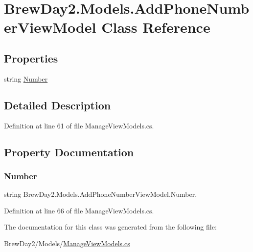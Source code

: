 \hypertarget{class_brew_day2_1_1_models_1_1_add_phone_number_view_model}{}\section{Brew\+Day2.\+Models.\+Add\+Phone\+Number\+View\+Model Class Reference}
\label{class_brew_day2_1_1_models_1_1_add_phone_number_view_model}
\subsection*{Properties}
\begin{DoxyCompactItemize}
\item 
string \mbox{\hyperlink{class_brew_day2_1_1_models_1_1_add_phone_number_view_model_a7a76c17793a515e68133253a060c34ea}{Number}}
\end{DoxyCompactItemize}


\subsection{Detailed Description}


Definition at line 61 of file Manage\+View\+Models.\+cs.



\subsection{Property Documentation}
\mbox{\label{class_brew_day2_1_1_models_1_1_add_phone_number_view_model_a7a76c17793a515e68133253a060c34ea}} 
\subsubsection{\texorpdfstring{Number}{Number}}
{\footnotesize\ttfamily string Brew\+Day2.\+Models.\+Add\+Phone\+Number\+View\+Model.\+Number\hspace{0.3cm}{\ttfamily [get]}, {\ttfamily [set]}}



Definition at line 66 of file Manage\+View\+Models.\+cs.



The documentation for this class was generated from the following file\+:\begin{DoxyCompactItemize}
\item 
Brew\+Day2/\+Models/\mbox{\hyperlink{_manage_view_models_8cs}{Manage\+View\+Models.\+cs}}\end{DoxyCompactItemize}
